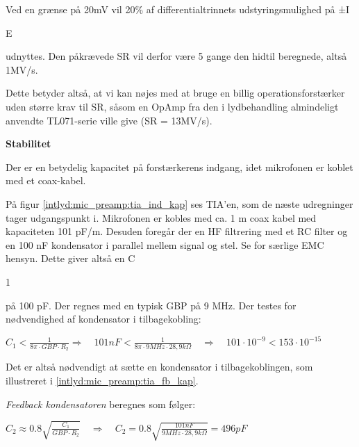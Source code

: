 Ved en grænse på 20mV vil 20\% af differentialtrinnets udstyringsmulighed på ±I\begin{tiny}E\end{tiny} udnyttes. Den påkrævede SR vil derfor være 5 gange den hidtil beregnede, altså 1MV/s.

Dette betyder altså, at vi kan nøjes med at bruge en billig operationsforstærker uden større krav til SR, såsom en OpAmp fra den i lydbehandling almindeligt anvendte TL071-serie ville give (SR = 13MV/s).

\textbf{Stabilitet}

Der er en betydelig kapacitet på forstærkerens indgang, idet mikrofonen er koblet med et coax-kabel.


På figur \ref{intlyd:mic_preamp:tia_ind_kap} ses TIA'en, som de næste udregninger tager udgangspunkt i. Mikrofonen er kobles med ca. 1 m coax kabel med kapaciteten 101 pF/m. Desuden foregår der en HF filtrering med et RC filter og en 100 nF kondensator i parallel mellem signal og stel. Se \citep[EMC]{cd} for særlige EMC hensyn. Dette giver altså en C\begin{tiny}1\end{tiny} på 100 pF.
Der regnes med en typisk GBP på 9 MHz. Der testes for nødvendighed af kondensator i tilbagekobling:
\begin{center}
${ C }_{ 1 }<\frac { 1 }{ 8\pi \cdot GBP\cdot { R }_{ 2 } } \Longrightarrow \quad 101nF<\frac { 1 }{ 8\pi \cdot 9MHz\cdot 28,9k\Omega  } \quad \Longrightarrow \quad 101\cdot { 10 }^{ -9 }<153\cdot { 10 }^{ -15 }$
\end{center}
Det er altså nødvendigt at sætte en kondensator i tilbagekoblingen, som illustreret i \ref{intlyd:mic_preamp:tia_fb_kap}.


\textit{Feedback kondensatoren} beregnes som følger:
\begin{center}
${ C }_{ 2 }\approx 0.8\sqrt { \frac { { C }_{ 1 } }{ GBP\cdot { R }_{ 2 } }  } \quad \Longrightarrow \quad { C }_{ 2 }=0.8\sqrt { \frac { 101nF }{ 9MHz\cdot 28,9k\Omega  }  } =496pF\quad$
\end{center}

